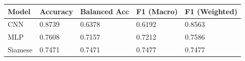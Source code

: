 \begin{tabular}{lllll}
\toprule
Model & Accuracy & Balanced Acc & F1 (Macro) & F1 (Weighted) \\
\midrule
CNN & 0.8739 & 0.6378 & 0.6192 & 0.8563 \\
MLP & 0.7608 & 0.7157 & 0.7212 & 0.7586 \\
Siamese & 0.7471 & 0.7471 & 0.7477 & 0.7477 \\
\bottomrule
\end{tabular}
